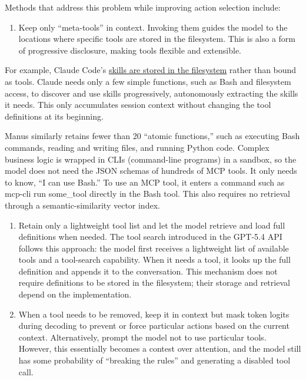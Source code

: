 Methods that address this problem while improving action selection include:

\begin{enumerate}
\def\labelenumi{\arabic{enumi}.}
\tightlist
\item
  Keep only ``meta-tools'' in context. Invoking them guides the model to the locations where specific tools are stored in the filesystem. This is also a form of progressive disclosure, making tools flexible and extensible.
\end{enumerate}

For example, Claude Code's \href{https://simonwillison.net/2025/Oct/16/claude-skills/\#skills-depend-on-a-coding-environment}{skills are stored in the filesystem} rather than bound as tools. Claude needs only a few simple functions, such as Bash and filesystem access, to discover and use skills progressively, autonomously extracting the skills it needs. This only accumulates session context without changing the tool definitions at its beginning.

Manus similarly retains fewer than 20 ``atomic functions,'' such as executing Bash commands, reading and writing files, and running Python code. Complex business logic is wrapped in CLIs (command-line programs) in a sandbox, so the model does not need the JSON schemas of hundreds of MCP tools. It only needs to know, ``I can use Bash.'' To use an MCP tool, it enters a command such as mcp-cli run some\_tool directly in the Bash tool. This also requires no retrieval through a semantic-similarity vector index.

\begin{enumerate}
\def\labelenumi{\arabic{enumi}.}
\setcounter{enumi}{1}
\item
  Retain only a lightweight tool list and let the model retrieve and load full definitions when needed. The tool search introduced in the GPT-5.4 API follows this approach: the model first receives a lightweight list of available tools and a tool-search capability. When it needs a tool, it looks up the full definition and appends it to the conversation. This mechanism does not require definitions to be stored in the filesystem; their storage and retrieval depend on the implementation.
\item
  When a tool needs to be removed, keep it in context but mask token logits during decoding to prevent or force particular actions based on the current context. Alternatively, prompt the model not to use particular tools. However, this essentially becomes a contest over attention, and the model still has some probability of ``breaking the rules'' and generating a disabled tool call.
\end{enumerate}

